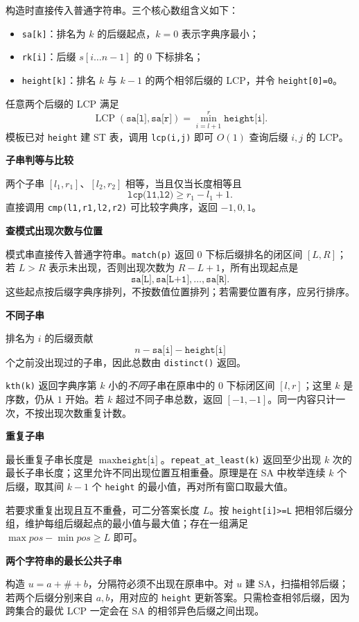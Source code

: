构造时直接传入普通字符串。三个核心数组含义如下：

\begin{itemize}
  \item \texttt{sa[k]}：排名为 $k$ 的后缀起点，$k=0$ 表示字典序最小；
  \item \texttt{rk[i]}：后缀 $s[i\ldots n-1]$ 的 $0$ 下标排名；
  \item \texttt{height[k]}：排名 $k$ 与 $k-1$ 的两个相邻后缀的 LCP，并令 \texttt{height[0]=0}。
\end{itemize}

任意两个后缀的 LCP 满足
\[
  \operatorname{LCP}(\texttt{sa[l]},\texttt{sa[r]})
  =\min_{i=l+1}^{r}\texttt{height[i]}.
\]
模板已对 \texttt{height} 建 ST 表，调用 \texttt{lcp(i,j)} 即可 $O(1)$ 查询后缀 $i,j$ 的 LCP。

\textbf{子串判等与比较}

两个子串 $[l_1,r_1]$、$[l_2,r_2]$ 相等，当且仅当长度相等且
\[
  \texttt{lcp(l1,l2)}\ge r_1-l_1+1.
\]
直接调用 \texttt{cmp(l1,r1,l2,r2)} 可比较字典序，返回 $-1,0,1$。

\textbf{查模式出现次数与位置}

模式串直接传入普通字符串。\texttt{match(p)} 返回 $0$ 下标后缀排名的闭区间 $[L,R]$；若 $L>R$ 表示未出现，否则出现次数为 $R-L+1$，所有出现起点是
\[
  \texttt{sa[L]},\texttt{sa[L+1]},\ldots,\texttt{sa[R]}.
\]
这些起点按后缀字典序排列，不按数值位置排列；若需要位置有序，应另行排序。

\textbf{不同子串}

排名为 $i$ 的后缀贡献
\[
  n-\texttt{sa[i]}-\texttt{height[i]}
\]
个之前没出现过的子串，因此总数由 \texttt{distinct()} 返回。

\texttt{kth(k)} 返回字典序第 $k$ 小的\emph{不同}子串在原串中的 $0$ 下标闭区间 $[l,r]$；这里 $k$ 是序数，仍从 $1$ 开始。若 $k$ 超过不同子串总数，返回 $[-1,-1]$。同一内容只计一次，不按出现次数重复计数。

\textbf{重复子串}

最长重复子串长度是 $\max\texttt{height[i]}$。\texttt{repeat\_at\_least(k)} 返回至少出现 $k$ 次的最长子串长度；这里允许不同出现位置互相重叠。原理是在 SA 中枚举连续 $k$ 个后缀，取其间 $k-1$ 个 \texttt{height} 的最小值，再对所有窗口取最大值。

若要求重复出现且互不重叠，可二分答案长度 $L$。按 \texttt{height[i]>=L} 把相邻后缀分组，维护每组后缀起点的最小值与最大值；存在一组满足 $\max pos-\min pos\ge L$ 即可。

\textbf{两个字符串的最长公共子串}

构造 $u=a+\# +b$，分隔符必须不出现在原串中。对 $u$ 建 SA，扫描相邻后缀；若两个后缀分别来自 $a,b$，用对应的 \texttt{height} 更新答案。只需检查相邻后缀，因为跨集合的最优 LCP 一定会在 SA 的相邻异色后缀之间出现。
